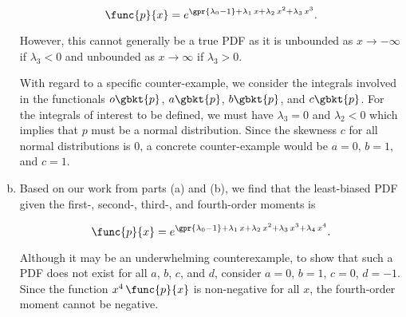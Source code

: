 \begin{enumerate}[(a)]
	$$\func{p}{x} = e^{\gpr{\lambda_0 - 1} + \lambda_1\,x + \lambda_2\,x^2 + \lambda_3\,x^3}.$$
	
	However, this cannot generally be a true PDF as it is unbounded as $x \to -\infty$ if $\lambda_3 < 0$ and unbounded as $x \to \infty$ if $\lambda_3 > 0$.
	
	With regard to a specific counter-example, we consider the integrals involved in the functionals $o\gbkt{p}$, $a\gbkt{p}$, $b\gbkt{p}$, and $c\gbkt{p}$. For the integrals of interest to be defined, we must have $\lambda_3 = 0$ and $\lambda_2 < 0$ which implies that $p$ must be a normal distribution. Since the skewness $c$ for all normal distributions is $0$, a concrete counter-example would be $a = 0$, $b = 1$, and $c = 1$.
	
	\item Based on our work from parts (a) and (b), we find that the least-biased PDF given the first-, second-, third-, and fourth-order moments is
	
	$$\func{p}{x} = e^{\gpr{\lambda_0 - 1} + \lambda_1\,x + \lambda_2\,x^2 + \lambda_3\,x^3 + \lambda_4\,x^4}.$$
	
	Although it may be an underwhelming counterexample, to show that such a PDF does not exist for all $a$, $b$, $c$, and $d$, consider $a = 0$, $b = 1$, $c = 0$, $d = -1$. Since the function $x^4\,\func{p}{x}$ is non-negative for all $x$, the fourth-order moment cannot be negative.

\end{enumerate}

